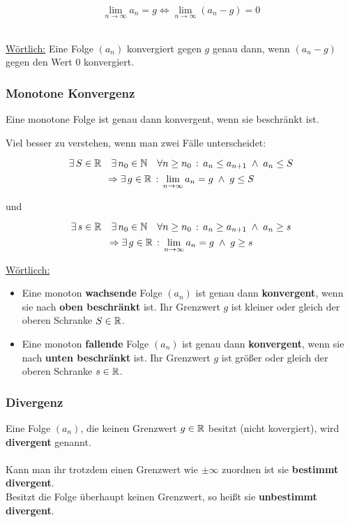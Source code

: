  
\begin{Theorem}

$$\lim\limits_{n\to\infty}a_n=g\Leftrightarrow \lim\limits_{n\to\infty}(a_n-g)=0$$
\end{Theorem}
\\
\underline{Wörtlich:} Eine Folge $(a_n)$ konvergiert gegen $g$ genau dann, wenn $(a_n-g)$ gegen den Wert $0$ konvergiert.
\subsubsection{Monotone Konvergenz}


\begin{Theorem}
Eine monotone Folge ist genau dann konvergent, wenn sie beschränkt ist.
\end{Theorem}

\begin{Beweis}
\end{Beweis}

Viel besser zu verstehen, wenn man zwei Fälle unterscheidet:

\begin{Theorem}
$$\exists\, S\in\mathbb{R} \quad \exists \,n_0\in\mathbb{N} \quad \forall n\geq n_0\,:\, a_n\leq a_{n+1}\; \land \; a_n\leq S$$
$$\Rightarrow \exists\, g\in\mathbb{R} \,:\, \lim\limits_{n\to\infty}a_n=g\;\land\; g\leq S $$
 \begin{center}und\end{center}
$$\exists \, s\in\mathbb{R} \quad\exists \, n_0\in\mathbb{N} \quad \forall n\geq n_0\,:\, a_n\geq a_{n+1}\; \land \;a_n\geq s$$
$$\Rightarrow \exists \, g\in\mathbb{R} \,:\, \lim\limits_{n\to\infty}a_n=g\;\land\; g\geq s$$
\end{Theorem}

	\underline{Wörtlicch:}
\begin{itemize}
\item Eine monoton \textbf{wachsende} Folge $(a_n)$ ist genau dann \textbf{konvergent}, wenn sie nach \textbf{oben beschränkt} ist. Ihr Grenzwert $g$ ist kleiner oder gleich der oberen Schranke $S\in\mathbb{R}$.
\item  Eine monoton \textbf{fallende} Folge $(a_n)$ ist genau dann \textbf{konvergent}, wenn sie nach \textbf{unten beschränkt} ist. Ihr Grenzwert $g$ ist größer oder gleich der oberen Schranke $s\in\mathbb{R}$.
\end{itemize}

\subsubsection{Divergenz}
\begin{Definition}
Eine Folge $(a_n)$, die keinen Grenzwert $g\in\mathbb{R}$ besitzt (nicht kovergiert), wird \textbf{divergent} genannt.\\\\
Kann man ihr trotzdem einen Grenzwert wie $\pm\infty$ zuordnen ist sie \textbf{bestimmt divergent}.\\
Besitzt die Folge überhaupt keinen Grenzwert, so heißt sie \textbf{unbestimmt divergent}.
\end{Definition}

